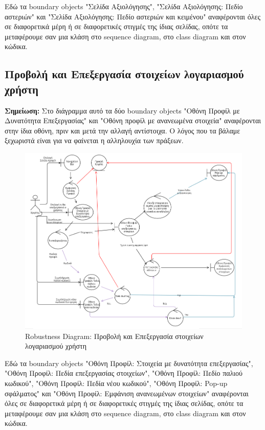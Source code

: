 \documentclass[12pt,a4paper]{article}
\begin{document}
Εδώ τα boundary objects "Σελίδα Αξιολόγησης", "Σελίδα Αξιολόγησης: Πεδίο αστεριών" και "Σελίδα Αξιολόγησης: Πεδίο αστεριών και κειμένου" αναφέρονται όλες σε διαφορετικά μέρη ή σε διαφορετικές στιγμές της ίδιας σελίδας, οπότε τα μεταφέρουμε σαν μια κλάση στο sequence diagram, στο class diagram και στον κώδικα.

\subsection{Προβολή και Επεξεργασία στοιχείων λογαριασμού χρήστη}
\textbf{Σημείωση:} Στο διάγραμμα αυτό τα δύο boundary objects "Οθόνη Προφίλ με Δυνατότητα Επεξεργασίας" και "Οθόνη προφίλ με ανανεωμένα στοιχεία" αναφέρονται στην ίδια οθόνη, πριν και μετά την αλλαγή αντίστοιχα. Ο λόγος που τα βάλαμε ξεχωριστά είναι για να φαίνεται η αλληλουχία των πράξεων.
\begin{figure}[H]
	\includegraphics[width=\textwidth]{View and Edit User Account Details Robustness.png}
	\caption{Robustness Diagram: Προβολή και Επεξεργασία στοιχείων λογαριασμού χρήστη}
	\label{Robustness Diagram: Προβολή και Επεξεργασία στοιχείων λογαριασμού χρήστη}
\end{figure}

Εδώ τα boundary objects "Οθόνη Προφίλ: Στοιχεία με δυνατότητα επεξεργασίας", "Οθόνη Προφίλ: Πεδία επεξεργασίας στοιχείων", "Οθόνη Προφίλ: Πεδίο παλιού κωδικού", "Οθόνη Προφίλ: Πεδία νέου κωδικού", "Οθόνη Προφίλ: Pop-up σφάλματος" και "Οθόνη Προφίλ: Εμφάνιση ανανεωμένων στοιχείων" αναφέρονται όλες σε διαφορετικά μέρη ή σε διαφορετικές στιγμές της ίδιας σελίδας, οπότε τα μεταφέρουμε σαν μια κλάση στο sequence diagram, στο class diagram και στον κώδικα.
\end{document}
